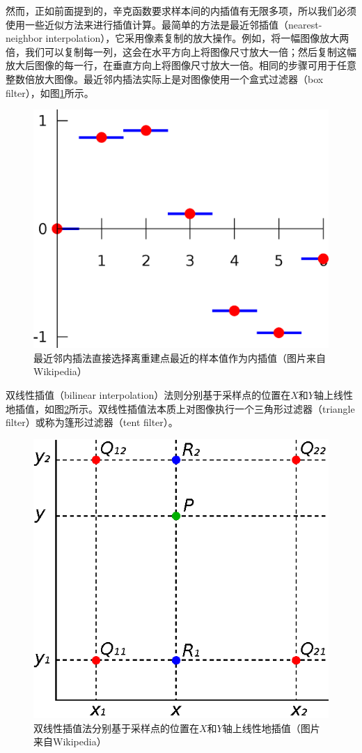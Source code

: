 然而，正如前面提到的，辛克函数要求样本间的内插值有无限多项，所以我们必须使用一些近似方法来进行插值计算。最简单的方法是最近邻插值（nearest-neighbor interpolation），它采用像素复制的放大操作。例如，将一幅图像放大两倍，我们可以复制每一列，这会在水平方向上将图像尺寸放大一倍；然后复制这幅放大后图像的每一行，在垂直方向上将图像尺寸放大一倍。相同的步骤可用于任意整数倍放大图像。最近邻内插法实际上是对图像使用一个盒式过滤器（box filter），如图\ref{f:intro-Piecewise_constant}所示。

\begin{figure}
\sidecaption
	\includegraphics[width=.45\textwidth]{figures/intro/Piecewise_constant}
	\caption{最近邻内插法直接选择离重建点最近的样本值作为内插值（图片来自Wikipedia）}
	\label{f:intro-Piecewise_constant}
\end{figure}

双线性插值（bilinear interpolation）法则分别基于采样点的位置在$X$和$Y$轴上线性地插值，如图\ref{f:intro-BilinearInterpolation}所示。双线性插值法本质上对图像执行一个三角形过滤器（triangle filter）或称为篷形过滤器（tent filter）。

\begin{figure}
\sidecaption
	\includegraphics[width=.45\textwidth]{figures/intro/BilinearInterpolation}
	\caption{双线性插值法分别基于采样点的位置在$X$和$Y$轴上线性地插值（图片来自Wikipedia）}
	\label{f:intro-BilinearInterpolation}
\end{figure}

